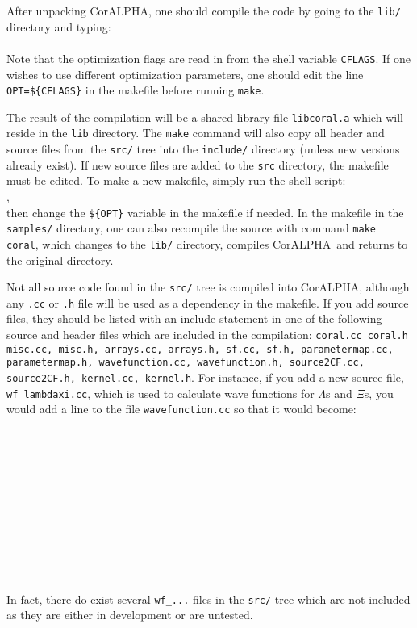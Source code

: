 \documentclass[10pt]{article}
\def\tab{\hspace*{9pt}}
\newcommand{\projectname}{CorALPHA}
\begin{document}
After unpacking \projectname, one should compile the code by going to the {\tt lib/} directory and typing:\\
\tab {\tt make}\\
Note that the optimization flags are read in from the shell variable {\tt CFLAGS}. If one wishes to use different optimization parameters, one should edit the line {\tt OPT=\$\{CFLAGS\}} in the makefile before running {\tt make}.

The result of the compilation will be a shared library file {\tt libcoral.a} which will reside in the {\tt lib} directory. The {\tt make} command will also copy all header and source files from the {\tt src/} tree into the {\tt include/} directory (unless new versions already exist). If new source files are added to the {\tt src} directory, the makefile must be edited. To make a new makefile, simply run the shell script:\\
\tab {\tt makemaker.sh > makefile},\\
then change the {\tt \$\{OPT\}} variable in the makefile if needed. In the makefile in the {\tt samples/} directory, one can also recompile the source with command {\tt make coral}, which changes to the {\tt lib/} directory, compiles \projectname\ and returns to the original directory.

Not all source code found in the {\tt src/} tree is compiled into \projectname, although any {\tt *.cc} or {\tt *.h} file will be used as a dependency in the makefile. If you add source files, they should be listed with an include statement in one of the following source and header files which are included in the compilation: {\tt coral.cc \tt coral.h \tt misc.cc, misc.h, arrays.cc, arrays.h, sf.cc, sf.h, parametermap.cc, parametermap.h, wavefunction.cc, wavefunction.h, source2CF.cc, source2CF.h, kernel.cc, kernel.h}. For instance, if you add a new source file, {\tt wf\_lambdaxi.cc}, which is used to calculate wave functions for $\Lambda$s and $\Xi$s, you would add a line to the  file {\tt wavefunction.cc} so that it would become:\\
\tab {\tt \#include "wavefunction.h"}\\
\tab {\tt \#include "wfcommon.cc"}\\
\tab {\tt \#include "planewave.cc"}\\
\tab {\tt \#include "partwave.cc"}\\
\tab {\tt \#include "pipi\_phaseshifts.cc"}\\
\tab {\tt \#include "wf\_pp.cc"}\\
\tab {\tt \#include "wf\_pkplus.cc"}\\
\tab {\tt \#include "wf\_pipluspiplus.cc"}\\
\tab {\tt \#include "wf\_pipluspiminus.cc"}\\
\tab {\tt \#include "wf\_nn.cc"}\\
\tab {\tt \#include "wf\_lambdaxi.cc}\\
In fact, there do exist several {\tt wf\_...} files in the {\tt src/} tree which are not included as they are either in development or are untested.
\end{document}
